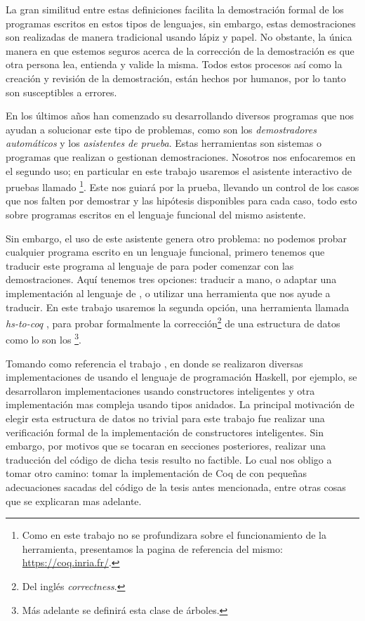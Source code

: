 La gran similitud entre estas definiciones 
facilita la demostraci\'on formal de los programas escritos en estos tipos de lenguajes, sin
embargo, estas demostraciones son realizadas de manera tradicional usando l\'apiz y papel.
No obstante, la \'unica manera en que estemos seguros acerca de la correcci\'on de la
demostraci\'on es que otra persona lea, entienda y valide la misma. Todos estos procesos as\'i como 
la creaci\'on y revisi\'on de la demostraci\'on, están hechos por humanos, por lo tanto son 
susceptibles a errores.

En los últimos años han comenzado su desarrollando diversos programas que nos ayudan a solucionar este
tipo de problemas, como son los \textit{demostradores autom\'aticos} y los \textit{asistentes de
prueba}. Estas herramientas son sistemas o programas que realizan o gestionan demostraciones. 
Nosotros nos enfocaremos en el segundo uso; en particular en este trabajo usaremos el asistente 
interactivo de pruebas llamado {\coq}\footnote{Como en este trabajo no se profundizara sobre el 
funcionamiento de la herramienta, presentamos la pagina de referencia del mismo: 
\url{https://coq.inria.fr/}.}. Este nos guiar\'a por la prueba, llevando un control de 
los casos que nos falten por demostrar y las hip\'otesis disponibles para cada caso, todo esto sobre 
programas escritos en el lenguaje funcional del mismo asistente.

Sin embargo, el uso de este asistente genera otro problema: no podemos probar cualquier programa
escrito en un lenguaje funcional, primero tenemos que traducir este programa al lenguaje de {\coq}
para poder comenzar con las demostraciones. Aquí tenemos tres opciones: traducir a mano, o adaptar 
una implementación al lenguaje de {\coq}, o utilizar una herramienta que nos ayude a traducir. En 
este trabajo usaremos la segunda opci\'on, una herramienta llamada \textit{hs-to-coq} \cite{thrc}, 
para probar formalmente la correcci\'on\footnote{Del ingl\'es \textit{correctness}.} de una estructura 
de datos como lo son los {\arns}\footnote{M\'as adelante se definir\'a esta clase de \'arboles.}.

Tomando como referencia el trabajo \cite{tesisG}, en donde se realizaron diversas implementaciones 
de {\arns} usando el lenguaje de programaci\'on Haskell, por ejemplo, se desarrollaron 
implementaciones usando constructores inteligentes y otra implementaci\'on mas compleja usando tipos 
anidados. La principal motivación de elegir esta estructura de datos no trivial para este trabajo fue
realizar una verificaci\'on formal de la implementaci\'on de constructores inteligentes. Sin embargo,
por motivos que se tocaran en secciones posteriores, realizar una traducci\'on del c\'odigo de dicha tesis
resulto no factible. Lo cual nos obligo a tomar otro camino: tomar la implementación de Coq de {\arns}
con pequeñas adecuaciones sacadas del c\'odigo de la tesis antes mencionada, entre otras cosas que
se explicaran mas adelante.

